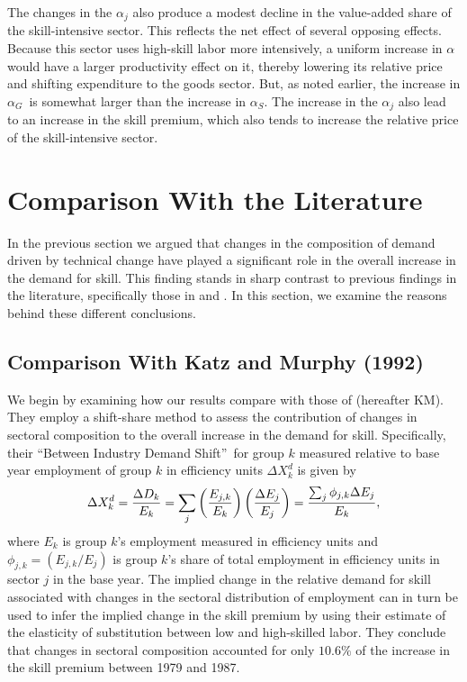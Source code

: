 \documentclass[12pt,english]{article}
\begin{document}
{\normalsize The changes in the $\alpha _{j}$ also produce a modest decline
in the value-added share of the skill-intensive sector. This reflects the
net effect of several opposing effects. Because this sector uses high-skill
labor more intensively, a uniform increase in $\alpha $ would have a larger
productivity effect on it, thereby lowering its relative price and shifting
expenditure to the goods sector. But, as noted earlier, the increase in $%
\alpha _{G}$\ is somewhat larger than the increase in $\alpha _{S}$. The
increase in the $\alpha _{j}$ also lead to an increase in the skill premium,
which also tends to increase the relative price of the skill-intensive
sector. }

\section{Comparison With the Literature}

{\normalsize In the previous section we argued that changes in the
composition of demand driven by technical change have played a significant
role in the overall increase in the demand for skill. This finding stands in
sharp contrast to previous findings in the literature, specifically those in %
\citet{KatMur92} and \citet{Leo15}. In this section, we examine the reasons
behind these different conclusions. }

\subsection{Comparison With Katz and Murphy (1992)}

{\normalsize We begin by examining how our results compare with those of %
\citet{KatMur92} (hereafter KM). They employ a shift-share method to assess
the contribution of changes in sectoral composition to the overall increase
in the demand for skill. Specifically, their \textquotedblleft Between
Industry Demand Shift\textquotedblright\ for group $k$ measured relative to
base year employment of group $k$ in efficiency units $\Delta X_{k}^{d}$ is
given by 
\begin{equation*}
\Delta X_{k}^{d}=\frac{\Delta D_{k}}{E_{k}}=\sum_{j}\left( \frac{E_{j,k}}{%
E_{k}}\right) \left( \frac{\Delta E_{j}}{E_{j}}\right) =\frac{\sum_{j}\phi
_{j,k}\Delta E_{j}}{E_{k}},
\end{equation*}%
where $E_{k}$ is group $k$'s employment measured in efficiency units and $%
\phi_{j,k}=\left( E_{j,k}/E_{j}\right) $ is group $k$'s share of total
employment in efficiency units in sector $j$ in the base year. The implied
change in the relative demand for skill associated with changes in the
sectoral distribution of employment can in turn be used to infer the implied
change in the skill premium by using their estimate of the elasticity of
substitution between low and high-skilled labor. They conclude that changes
in sectoral composition accounted for only $10.6\%$ of the increase in the
skill premium between 1979 and 1987. }
\end{document}
